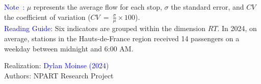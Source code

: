    \begin{table}[h!]
    \centering
    \renewcommand{\arraystretch}{1.5}
    \caption{Indicator grid grouped within the dimension related to  (\textsl{demand}).}
    \label{table-chap6:indicateurs-ridership}
        \vspace{5pt}
        \begin{flushleft}\scriptsize{
        \textcolor{blue}{Note~:} \(\mu\) represents the average flow for each stop, $\sigma$ the standard error, and \(CV\) the coefficient of variation (\(CV~=~\frac{\sigma}{\mu} \times 100\)).
        \\
        \textcolor{blue}{Reading Guide:} Six indicators are grouped within the dimension \(RT\). In 2024, on average, stations in the Hauts-de-France region received 14 passengers on a weekday between midnight and 6:00 AM.
        }\end{flushleft}
        \begin{flushright}\scriptsize{
        Realization: \textcolor{blue}{Dylan Moinse (2024)}
        \\
        Authors: \acrshort{NPART} Research Project
        }\end{flushright}
        \end{table}